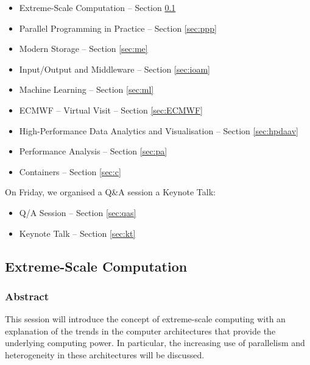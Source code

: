 \begin{itemize}

\item Extreme-Scale Computation -- Section \ref{sec:esc}

\item Parallel Programming in Practice -- Section \ref{sec:ppp}

\item Modern Storage -- Section \ref{sec:me}

\item Input/Output and Middleware -- Section \ref{sec:ioam}

\item Machine Learning -- Section \ref{sec:ml}

\item ECMWF -- Virtual Visit -- Section \ref{sec:ECMWF}

\item High-Performance Data Analytics and Visualisation -- Section \ref{sec:hpdaav}

\item Performance Analysis -- Section \ref{sec:pa}

\item Containers -- Section \ref{sec:c}

\end{itemize}

On Friday, we organised a Q\&A session a Keynote Talk:

\begin{itemize}

\item Q/A Session -- Section \ref{sec:qas}

\item Keynote Talk -- Section \ref{sec:kt}

\end{itemize}

\subsection{Extreme-Scale Computation}
\label{sec:esc}

\subsubsection{Abstract}

This session will introduce the concept of extreme-scale computing with an explanation of the trends in the computer architectures that provide the underlying computing power. In particular, the increasing use of parallelism and heterogeneity in these architectures will be discussed.

